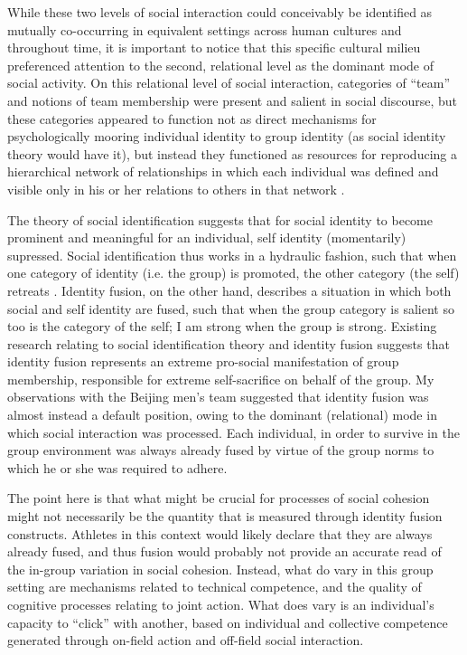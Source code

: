 \begin{CJK}{UTF8}{gbsn}
While these two levels of social interaction could conceivably be identified as mutually co-occurring in equivalent settings across human cultures and throughout time, it is important to notice that this specific cultural milieu preferenced attention to the second, relational level as the dominant mode of social activity.  On this relational level of social interaction, categories of ``team'' and notions of team membership were present and salient in social discourse, but these categories appeared to function not as direct mechanisms for psychologically mooring individual identity to group identity (as social identity theory would have it), but instead they functioned as resources for reproducing a hierarchical network of relationships in which each individual was defined and visible only in his or her relations to others in that network \cite{Yuki2003}.

The theory of social identification suggests that for social identity to become prominent and meaningful for an individual, self identity (momentarily) supressed.  Social identification thus works in a hydraulic fashion, such that when one category of identity (i.e. the group) is promoted, the other category (the self) retreats \citep{Swann2009}.  Identity fusion, on the other hand, describes a situation in which both social and self identity are fused, such that when the group category is salient so too is the category of the self; I am strong when the group is strong.  Existing research relating to social identification theory and identity fusion suggests that identity fusion represents an extreme pro-social manifestation of group membership, responsible for extreme self-sacrifice on behalf of the group.  My observations with the Beijing men's team suggested that identity fusion was almost instead a default position, owing to the dominant (relational) mode in which social interaction was processed.  Each individual, in order to survive in the group environment was always already fused by virtue of the group norms to which he or she was required to adhere.

The point here is that what might be crucial for processes of social cohesion might not necessarily be the quantity that is measured through identity fusion constructs. Athletes in this context would likely declare that they are always already fused, and thus fusion would probably not provide an accurate read of the in-group variation in social cohesion. Instead, what do vary in this group setting are mechanisms related to technical competence, and the quality of cognitive processes relating to joint action.  What does vary is an individual's capacity to ``click'' with another, based on individual and collective competence generated through on-field action and off-field social interaction.


\end{CJK}
